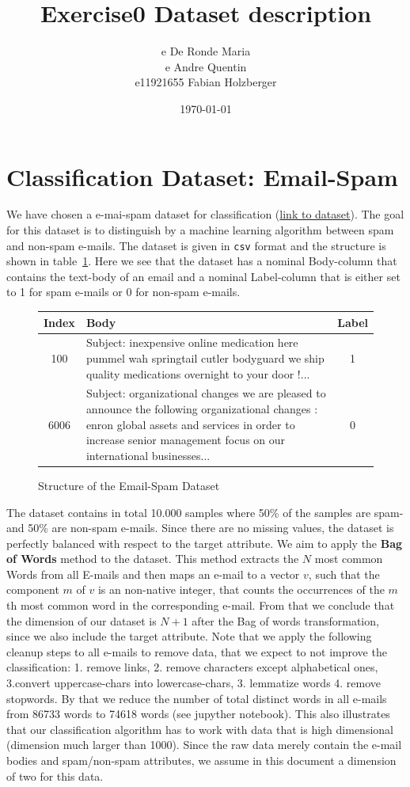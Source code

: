 \documentclass[11pt]{article}
\title{Exercise0 Dataset description}
\author{e De Ronde Maria \\ e Andre Quentin  \\ e11921655 Fabian Holzberger }
\date{\today}
\begin{document}
\graphicspath{{./figures/}}
\maketitle

\newpage
%
\section{Classification Dataset: Email-Spam}
We have chosen a e-mai-spam dataset for classification (\href{https://www.kaggle.com/nitishabharathi/email-spam-dataset?select=enronSpamSubset.csv}{link to dataset}). The goal for this dataset is to distinguish by a machine learning algorithm between spam and non-spam e-mails. The dataset is given in \texttt{csv} format and the structure is shown in table~\ref{tab::0}. Here we see that the dataset has a nominal Body-column that contains the text-body of an email and a nominal Label-column that is either set to 1 for spam e-mails or 0 for non-spam e-mails.
%
\begin{figure}[h]
  \begin{tabular}{ | c | p{13cm} | c |}
    \hline
    Index & Body & Label \\
    \hline
    100 & 
    Subject: inexpensive online medication here
 pummel wah springtail cutler bodyguard
 we ship quality medications overnight to your door !...
    & 1 \\ \hline
    6006
    &
    Subject: organizational changes
 we are pleased to announce the following organizational changes :
 enron global assets and services
 in order to increase senior management focus on our international businesses... 
    & 0 \\
    \hline
    \end{tabular}
    \caption{Structure of the Email-Spam Dataset}
    \label{tab::0}
  \end{figure}
%
The dataset contains in total 10.000 samples where 50\% of the samples are spam- and 50\% are non-spam e-mails. Since there are no missing values, the dataset is perfectly balanced with respect to the target attribute. We aim to apply the \textbf{Bag of Words} method to the dataset. This method extracts the $N$ most common Words from all E-mails and then maps an e-mail to a vector $v$, such that the component $m$ of $v$ is an non-native integer, that counts the occurrences of the $m$th most common word in the corresponding e-mail. From that we conclude that the dimension of our dataset is $N+1$ after the Bag of words transformation, since we also include the target attribute. Note that we apply the following cleanup steps to all e-mails to remove data, that we expect to not improve the classification: 1. remove links, 2. remove characters except alphabetical ones, 3.convert uppercase-chars into lowercase-chars, 3. lemmatize words 4. remove stopwords. By that we reduce the number of total distinct words in all e-mails from 86733 words to 74618 words (see jupyther notebook). This also illustrates that our classification algorithm has to work with data that is high dimensional (dimension much larger than 1000). Since the raw data merely contain the e-mail bodies and spam/non-spam attributes, we assume in this document a dimension of two for this data.         
\end{document}
